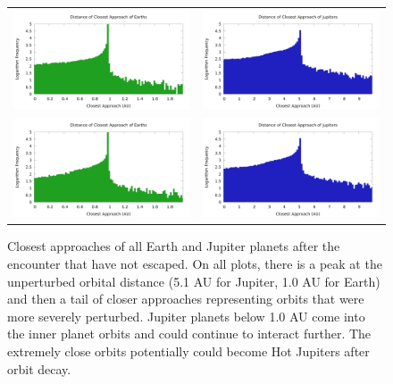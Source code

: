 \documentclass[12pt]{article}
\begin{document}
    \begin{figure}[H]
        \centering
        \caption{Closest approaches of all Earth and Jupiter planets after 
            the encounter that have not escaped. On all plots, there is a peak
            at the unperturbed orbital distance (5.1 AU for Jupiter, 1.0 AU for
            Earth) and then a tail of closer approaches representing
            orbits that were more severely perturbed. Jupiter planets below 1.0 AU
            come into the inner planet orbits and could continue to interact further.
            The extremely close orbits potentially could become Hot Jupiters after
            orbit decay.
        }
        \label{fig:periastron}
        \begin{tabular}{cc}
            \includegraphics[width=3.25in]{periastron_earth_1000} &
            \includegraphics[width=3.25in]{periastron_jupiter_1000} \\

            \includegraphics[width=3.25in]{periastron_earth_4000} &
            \includegraphics[width=3.25in]{periastron_jupiter_4000} \\
        \end{tabular}
    \end{figure}
    
\end{document}
